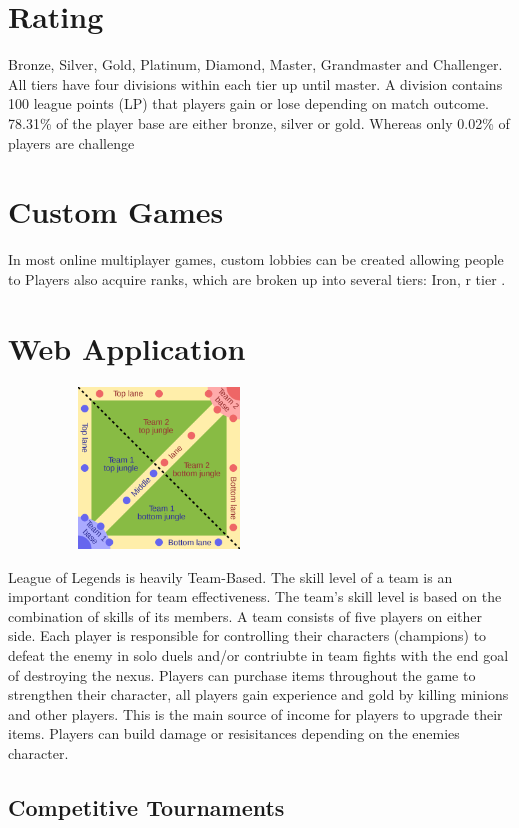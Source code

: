 \section{Rating}
Bronze, Silver, Gold, Platinum, Diamond, Master, Grandmaster and Challenger. All tiers have four divisions within each tier up until master. A division contains 100 league points (LP) that players gain or lose depending on match outcome. 78.31\% of the player base are either bronze, silver or gold. Whereas only 0.02\% of players are challenge
\section{Custom Games}
In most online multiplayer games, custom lobbies can be created allowing people to
Players also acquire ranks, which are broken up into several tiers: Iron, r tier \cite{kou2016ranking}.
\section{Web Application}

\begin{center}    
	\includegraphics[width=8cm,height=4.3cm,keepaspectratio]{img/Map.png}
\end{center}
\clearpage

League of Legends is heavily Team-Based. The skill level of a team is an important condition for team effectiveness. The team's skill level is based on the combination of skills of its members.
A team consists of five players on either side. Each player is responsible for controlling their characters (champions) to defeat the enemy in solo duels and/or contriubte in team fights with the end goal of destroying the nexus. Players can purchase items throughout the game to strengthen their character, all players gain experience and gold by killing minions and other players. This is the main source of income for players to upgrade their items. Players can build damage or resisitances depending on the enemies character.

\subsection{Competitive Tournaments}

